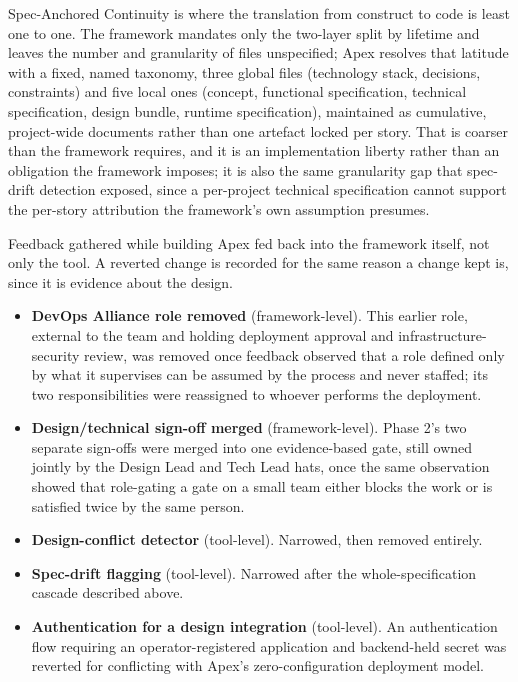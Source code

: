 \documentclass[sigconf,review=false]{acmart}
\begin{document}
Spec-Anchored Continuity is where the translation from construct to code is least one to one. The framework mandates only the two-layer split by lifetime and leaves the number and granularity of files unspecified; Apex resolves that latitude with a fixed, named taxonomy, three global files (technology stack, decisions, constraints) and five local ones (concept, functional specification, technical specification, design bundle, runtime specification), maintained as cumulative, project-wide documents rather than one artefact locked per story. That is coarser than the framework requires, and it is an implementation liberty rather than an obligation the framework imposes; it is also the same granularity gap that spec-drift detection exposed, since a per-project technical specification cannot support the per-story attribution the framework's own assumption presumes.

Feedback gathered while building Apex fed back into the framework itself, not only the tool. A reverted change is recorded for the same reason a change kept is, since it is evidence about the design.

\begin{itemize}[leftmargin=0.5cm,itemsep=0.3em]
\item \textbf{DevOps Alliance role removed} (framework-level). This earlier role, external to the team and holding deployment approval and infrastructure-security review, was removed once feedback observed that a role defined only by what it supervises can be assumed by the process and never staffed; its two responsibilities were reassigned to whoever performs the deployment.
\item \textbf{Design/technical sign-off merged} (framework-level). Phase 2's two separate sign-offs were merged into one evidence-based gate, still owned jointly by the Design Lead and Tech Lead hats, once the same observation showed that role-gating a gate on a small team either blocks the work or is satisfied twice by the same person.
\item \textbf{Design-conflict detector} (tool-level). Narrowed, then removed entirely.
\item \textbf{Spec-drift flagging} (tool-level). Narrowed after the whole-specification cascade described above.
\item \textbf{Authentication for a design integration} (tool-level). An authentication flow requiring an operator-registered application and backend-held secret was reverted for conflicting with Apex's zero-configuration deployment model.
\end{itemize}
\end{document}

